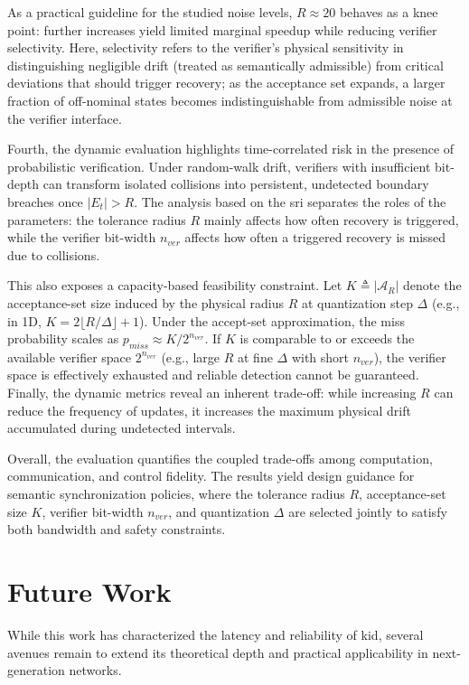 As a practical guideline for the studied noise levels, $R\approx 20$ behaves as a knee point: further increases yield limited marginal speedup while reducing verifier selectivity. Here, selectivity refers to the verifier's physical sensitivity in distinguishing negligible drift (treated as semantically admissible) from critical deviations that should trigger recovery; as the acceptance set expands, a larger fraction of off-nominal states becomes indistinguishable from admissible noise at the verifier interface.

Fourth, the dynamic evaluation highlights time-correlated risk in the presence of probabilistic verification. Under random-walk drift, verifiers with insufficient bit-depth can transform isolated collisions into persistent, undetected boundary breaches once $|E_t|>R$. The analysis based on the \gls{sri} separates the roles of the parameters: the tolerance radius $R$ mainly affects how often recovery is triggered, while the verifier bit-width $n_{ver}$ affects how often a triggered recovery is missed due to collisions.

This also exposes a capacity-based feasibility constraint. Let $K\triangleq |\mathcal{A}_R|$ denote the acceptance-set size induced by the physical radius $R$ at quantization step $\Delta$ (e.g., in 1D, $K=2\lfloor R/\Delta\rfloor+1$). Under the accept-set approximation, the miss probability scales as $p_{miss}\approx K/2^{n_{ver}}$. If $K$ is comparable to or exceeds the available verifier space $2^{n_{ver}}$ (e.g., large $R$ at fine $\Delta$ with short $n_{ver}$), the verifier space is effectively exhausted and reliable detection cannot be guaranteed. Finally, the dynamic metrics reveal an inherent trade-off: while increasing $R$ can reduce the frequency of updates, it increases the maximum physical drift accumulated during undetected intervals.

Overall, the evaluation quantifies the coupled trade-offs among computation, communication, and control fidelity. The results yield design guidance for semantic synchronization policies, where the tolerance radius $R$, acceptance-set size $K$, verifier bit-width $n_{ver}$, and quantization $\Delta$ are selected jointly to satisfy both bandwidth and safety constraints.

\section{Future Work}
\label{sec:future_work}

While this work has characterized the latency and reliability of \gls{kid}, several avenues remain to extend its theoretical depth and practical applicability in next-generation networks.

